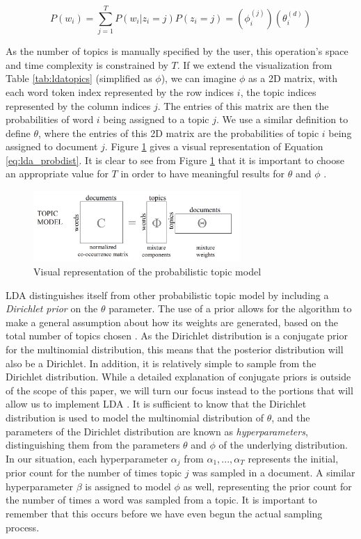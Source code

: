 \documentclass[a4paper]{article}
\begin{document}
\begin{equation}\label{eq:lda_probdist}
  P(w_i) = \sum\limits_{j=1}^T P(w_i | z_i = j) P(z_i = j) = (\phi^{(j)}_i) (\theta^{(d)}_i)
\end{equation}

As the number of topics is manually specified by the user, this operation's space and time complexity is constrained by $T$. If we extend the visualization from Table \ref{tab:ldatopics} (simplified as $\phi$), we can imagine $\phi$ as a 2D matrix, with each word token index represented by the row indices $i$, the topic indices represented by the column indices $j$. The entries of this matrix are then the probabilities of word $i$ being assigned to a topic $j$. We use a similar definition to define $\theta$, where the entries of this 2D matrix are the probabilities of topic $i$ being assigned to document $j$. Figure \ref{fig:topicmodel} gives a visual representation of Equation \ref{eq:lda_probdist}. It is clear to see from Figure \ref{fig:topicmodel} that it is important to choose an appropriate value for $T$ in order to have meaningful results for $\theta$ and $\phi$ \cite{lda}.

\begin{figure}[h]
  \centering
    \includegraphics[width=0.7\textwidth]{topicmodel}
  \caption {Visual representation of the probabilistic topic model}
  \label{fig:topicmodel}
\end{figure}

LDA distinguishes itself from other probabilistic topic model by including a \textit{Dirichlet prior} on the $\theta$ parameter. The use of a prior allows for the algorithm to make a general assumption about how its weights are generated, based on the total number of topics chosen \cite{hoffman}. As the Dirichlet distribution is a conjugate prior for the multinomial distribution, this means that the posterior distribution will also be a Dirichlet. In addition, it is relatively simple to sample from the Dirichlet distribution. While a detailed explanation of conjugate priors is outside of the scope of this paper, we will turn our focus instead to the portions that will allow us to implement LDA \cite{lda}. It is sufficient to know that the Dirichlet distribution is used to model the multinomial distribution of $\theta$, and the parameters of the Dirichlet distribution are known as \textit{hyperparameters}, distinguishing them from the parameters $\theta$ and $\phi$ of the underlying distribution. In our situation, each hyperparameter $\alpha_j$ from $\alpha_1, ..., \alpha_T$ represents the initial, prior count for the number of times topic $j$ was sampled in a document. A similar hyperparameter $\beta$ is assigned to model $\phi$ as well, representing the prior count for the number of times a word was sampled from a topic. It is important to remember that this occurs before we have even begun the actual sampling process.
\end{document}
